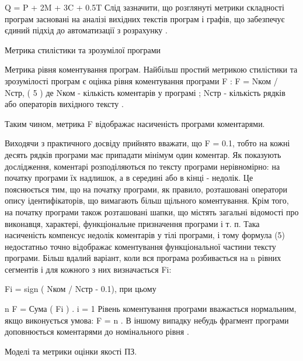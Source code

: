 Q = P + 2M + 3C + 0.5T
Слід зазначити, що розглянуті метрики складності програм засновані на аналізі вихідних текстів програм і графів, що забезпечує єдиний підхід до автоматизації з розрахунку .


Метрика стилістики та зрозумілої програми

Метрика рівня коментування програм.
Найбільш простий метрикою стилістики та зрозумілості програм є оцінка рівня коментування програми F :
F = Nком / Nстр, ( 5 )
де Nком - кількість коментарів у програмі ; Nстр - кількість рядків або операторів вихідного тексту .

Таким чином, метрика F відображає насиченість програми коментарями.

Виходячи з практичного досвіду прийнято вважати, що F = 0.1, тобто на кожні десять рядків програми має припадати мінімум один коментар. Як показують дослідження, коментарі розподіляються по тексту програми нерівномірно: на початку програми їх надлишок, а в середині або в кінці - недолік. Це пояснюється тим, що на початку програми, як правило, розташовані оператори опису ідентифікаторів, що вимагають більш щільного коментування. Крім того, на початку програми також розташовані шапки, що містять загальні відомості про виконавця, характері, функціональне призначення програми і т. п. Така насиченість компенсує недолік коментарів у тілі програми, і тому формула (5) недостатньо точно відображає коментування функціональної частини тексту програми.
Більш вдалий варіант, коли вся програма розбивається на n рівних сегментів і для кожного з них визначається Fi:

Fi = sign ( Nком / Nстр - 0.1),
при цьому

n
F = Сума ( Fi ) .
i = 1
Рівень коментування програми вважається нормальним, якщо виконується умова: F = n . В іншому випадку небудь фрагмент програми доповнюється коментарями до номінального рівня .

Моделі та метрики оцінки якості ПЗ.

